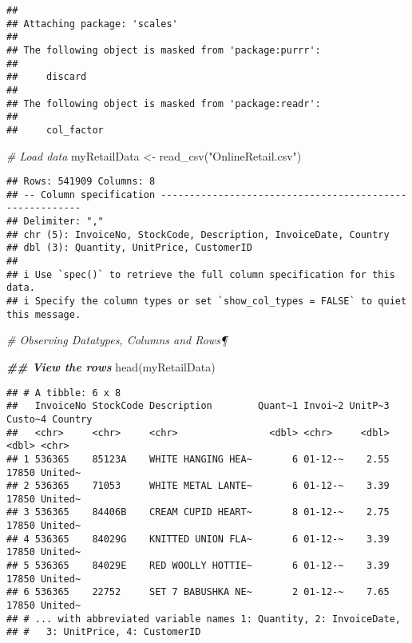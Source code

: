 \documentclass[
]{article}
\newenvironment{Shaded}{\begin{snugshade}}{\end{snugshade}}
\newcommand{\CommentTok}[1]{\textcolor[rgb]{0.56,0.35,0.01}{\textit{#1}}}
\newcommand{\DocumentationTok}[1]{\textcolor[rgb]{0.56,0.35,0.01}{\textbf{\textit{#1}}}}
\newcommand{\FunctionTok}[1]{\textcolor[rgb]{0.00,0.00,0.00}{#1}}
\newcommand{\NormalTok}[1]{#1}
\newcommand{\OtherTok}[1]{\textcolor[rgb]{0.56,0.35,0.01}{#1}}
\newcommand{\StringTok}[1]{\textcolor[rgb]{0.31,0.60,0.02}{#1}}
\begin{document}
\begin{verbatim}
## 
## Attaching package: 'scales'
## 
## The following object is masked from 'package:purrr':
## 
##     discard
## 
## The following object is masked from 'package:readr':
## 
##     col_factor
\end{verbatim}

\begin{Shaded}
\begin{Highlighting}[]
\CommentTok{\# Load data}
\NormalTok{myRetailData }\OtherTok{\textless{}{-}} \FunctionTok{read\_csv}\NormalTok{(}\StringTok{"OnlineRetail.csv"}\NormalTok{)}
\end{Highlighting}
\end{Shaded}

\begin{verbatim}
## Rows: 541909 Columns: 8
## -- Column specification --------------------------------------------------------
## Delimiter: ","
## chr (5): InvoiceNo, StockCode, Description, InvoiceDate, Country
## dbl (3): Quantity, UnitPrice, CustomerID
## 
## i Use `spec()` to retrieve the full column specification for this data.
## i Specify the column types or set `show_col_types = FALSE` to quiet this message.
\end{verbatim}

\begin{Shaded}
\begin{Highlighting}[]
\CommentTok{\# Observing Datatypes, Columns and Rows¶}

\DocumentationTok{\#\# View the rows}
\FunctionTok{head}\NormalTok{(myRetailData)}
\end{Highlighting}
\end{Shaded}

\begin{verbatim}
## # A tibble: 6 x 8
##   InvoiceNo StockCode Description        Quant~1 Invoi~2 UnitP~3 Custo~4 Country
##   <chr>     <chr>     <chr>                <dbl> <chr>     <dbl>   <dbl> <chr>  
## 1 536365    85123A    WHITE HANGING HEA~       6 01-12-~    2.55   17850 United~
## 2 536365    71053     WHITE METAL LANTE~       6 01-12-~    3.39   17850 United~
## 3 536365    84406B    CREAM CUPID HEART~       8 01-12-~    2.75   17850 United~
## 4 536365    84029G    KNITTED UNION FLA~       6 01-12-~    3.39   17850 United~
## 5 536365    84029E    RED WOOLLY HOTTIE~       6 01-12-~    3.39   17850 United~
## 6 536365    22752     SET 7 BABUSHKA NE~       2 01-12-~    7.65   17850 United~
## # ... with abbreviated variable names 1: Quantity, 2: InvoiceDate,
## #   3: UnitPrice, 4: CustomerID
\end{verbatim}
\end{document}
